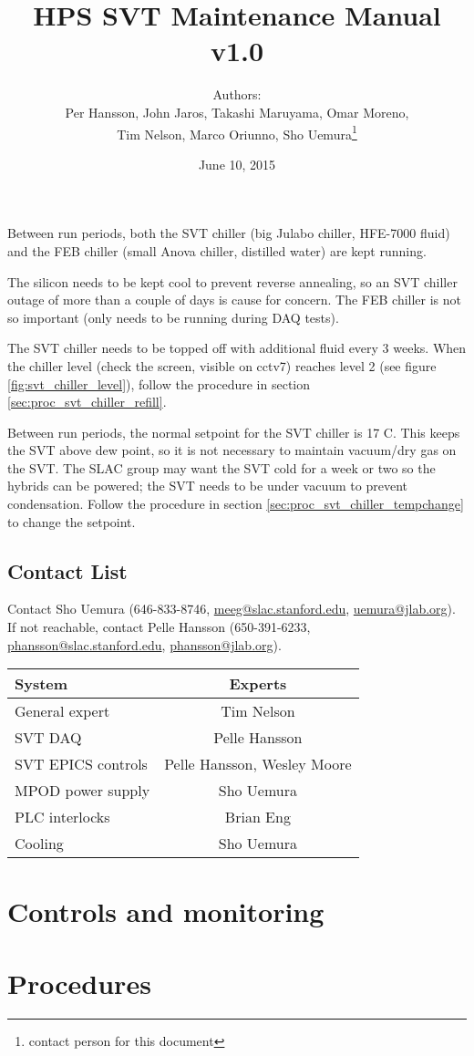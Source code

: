 \documentclass[12pt]{report}
\title{HPS SVT Maintenance Manual \\ v1.0}
\author{Authors: \\
Per Hansson, John Jaros, Takashi Maruyama, Omar Moreno,\\ Tim Nelson, Marco Oriunno, Sho Uemura\footnote{contact person for this document}}
\date{June 10, 2015} %
\begin{document}
\maketitle

Between run periods, both the SVT chiller (big Julabo chiller, HFE-7000 fluid) and the FEB chiller (small Anova chiller, distilled water) are kept running.

The silicon needs to be kept cool to prevent reverse annealing, so an SVT chiller outage of more than a couple of days is cause for concern. The FEB chiller is not so important (only needs to be running during DAQ tests).

The SVT chiller needs to be topped off with additional fluid every 3 weeks. When the chiller level (check the screen, visible on cctv7) reaches level 2 (see figure \ref{fig:svt_chiller_level}), follow the procedure in section \ref{sec:proc_svt_chiller_refill}.

Between run periods, the normal setpoint for the SVT chiller is 17 C. This keeps the SVT above dew point, so it is not necessary to maintain vacuum/dry gas on the SVT. 
The SLAC group may want the SVT cold for a week or two so the hybrids can be powered; the SVT needs to be under vacuum to prevent condensation. Follow the procedure in section \ref{sec:proc_svt_chiller_tempchange} to change the setpoint.

\section{Contact List}

Contact Sho Uemura (646-833-8746, {\url{meeg@slac.stanford.edu}, \url{uemura@jlab.org}}). If not reachable, contact Pelle Hansson (650-391-6233, \url{phansson@slac.stanford.edu}, \url{phansson@jlab.org}).

\begin{center}
    \begin{tabular}{lc}
        \hline \hline 
        System & Experts \\
        \hline
        General expert & Tim Nelson \\
        SVT DAQ & Pelle Hansson \\
        SVT EPICS controls & Pelle Hansson, Wesley Moore \\
        MPOD power supply & Sho Uemura \\
        PLC interlocks & Brian Eng \\
        Cooling & Sho Uemura \\
        \hline \hline
    \end{tabular}
\end{center}

\chapter{Controls and monitoring}



\chapter{Procedures}


\end{document}
